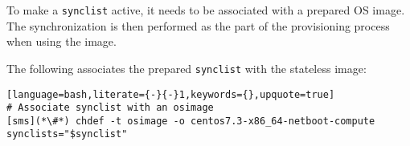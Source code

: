 To make a \texttt{synclist} active, it needs to be associated with a prepared OS
image. The synchronization is then performed as the part of the provisioning
process when using the image.


The following associates the prepared \texttt{synclist} with the stateless \xCAT{} image:

\begin{lstlisting}[language=bash,literate={-}{-}1,keywords={},upquote=true]
# Associate synclist with an osimage
[sms](*\#*) chdef -t osimage -o centos7.3-x86_64-netboot-compute synclists="$synclist"
\end{lstlisting}
